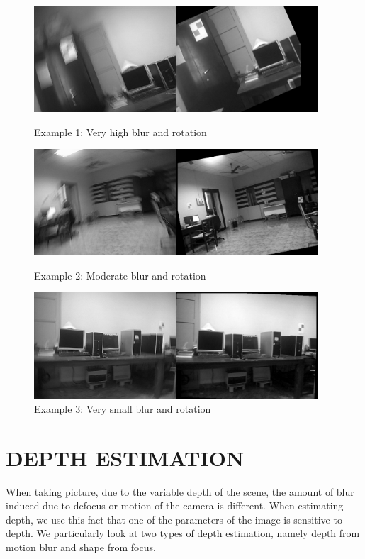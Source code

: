\documentclass[BTech]{iitmdiss}
\begin{document}
\begin{figure}[H]
\begin{center}
\includegraphics[width=300pt]{images/imreg/rotation/eg1/imreg.png}
\caption{Example 1: Very high blur and rotation}
\includegraphics[width=300pt]{images/imreg/rotation/eg2/imreg.png}
\caption{Example 2: Moderate blur and rotation}
\includegraphics[width=300pt]{images/imreg/rotation/eg3/imreg.png}
\caption{Example 3: Very small blur and rotation}
\end{center}
\end{figure}

\pagebreak
\chapter{DEPTH ESTIMATION}
\label{chap:depth_estimation}
When taking picture, due to the variable depth of the scene, the amount 
of blur induced due to defocus or motion of the camera is different. 
When estimating depth, we use this fact that one of the parameters of 
the image is sensitive to depth. We particularly look at two types of 
depth estimation, namely depth from motion blur and shape from focus.
\end{document}
